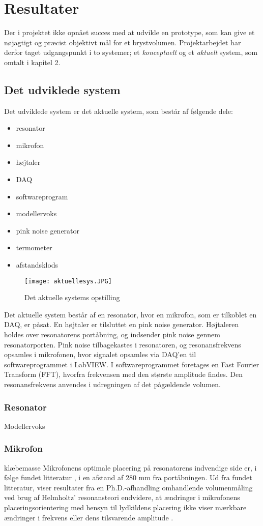 \chapter{Resultater}
Der i projektet ikke opnået succes med at udvikle en prototype, som kan give et nøjagtigt og præcist objektivt mål for et brystvolumen. Projektarbejdet har derfor taget udgangspunkt i to systemer; et \textit{konceptuelt} og et \textit{aktuelt} system, som omtalt i kapitel 2.  

\section{Det udviklede system}
Det udviklede system er det aktuelle system, som består af følgende dele: 

\begin{itemize}
\item resonator	
\item mikrofon 
\item højtaler
\item DAQ
\item softwareprogram
\item modellervoks
\item pink noise generator
\item termometer
\item afstandsklods
\end{itemize}

\begin{figure}[!h]
\centering
\texttt{[image: aktuellesys.JPG]}
\caption{Det aktuelle systems opstilling}
\label{fig:aktuellesys}	
\end{figure}

 Det aktuelle system består af en resonator, hvor en mikrofon, som er tilkoblet en DAQ, er påsat. En højtaler er tilsluttet en pink noise generator. Højtaleren holdes over resonatorens portåbning, og indsender pink noise gennem resonatorporten. Pink noise tilbagekastes i resonatoren, og resonansfrekvens opsamles i mikrofonen, hvor signalet opsamles via DAQ'en til softwareprogrammet i LabVIEW. I softwareprogrammet foretages en Fast Fourier Transform (FFT), hvorfra frekvensen med den største amplitude findes. Den resonansfrekvens anvendes i udregningen af det pågældende volumen.   

\subsection{Resonator}
 Modellervoks
\subsection{Mikrofon}
klæbemasse
Mikrofonens optimale placering på resonatorens indvendige side er, i følge fundet litteratur \citep{RefWorks:11}, i en afstand af 280 mm fra portåbningen. 
Ud fra fundet litteratur, viser resultater fra en Ph.D.-afhandling omhandlende volumenmåling ved brug af Helmholtz' resonansteori endvidere, at ændringer i mikrofonens placeringsorientering med hensyn til lydkildens placering ikke viser mærkbare ændringer i frekvens eller dens tilsvarende amplitude \citep{RefWorks:22}. 

